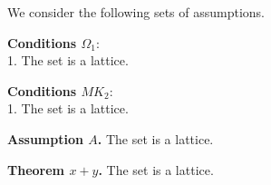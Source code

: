 \documentclass{article}
\begin{document}
We consider the following sets of assumptions.

{\bf Conditions $\Omega _1$}: \\
1. The set is a lattice.

{\bf Conditions $MK_2$}: \\
1. The set is a lattice.

{\bf Assumption $A$.} The set is a lattice.

{\bf Theorem $x+y$.} The set is a lattice.
\end{document}
